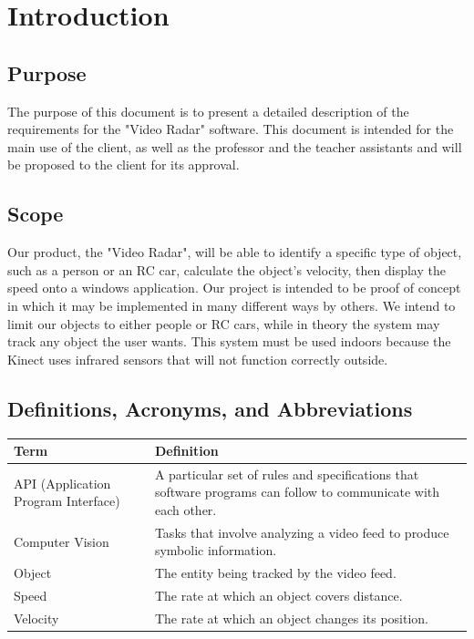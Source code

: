 \documentclass[onecolumn, draftclsnofoot,10pt, compsoc]{IEEEtran}
\begin{document}
\newpage
{}
\tableofcontents
\clearpage


\section{Introduction}
\subsection{Purpose}
The purpose of this document is to present a detailed description of the requirements for the "Video Radar" software.
This document is intended for the main use of the client, as well as the professor and the teacher assistants and will be proposed to the client for its approval.

\subsection{Scope}
Our product, the "Video Radar", will be able to identify a specific type of object, such as a person or an RC car, calculate the object's velocity, then display the speed onto a windows application.
Our project is intended to be proof of concept in which it may be implemented in many different ways by others.
We intend to limit our objects to either people or RC cars, while in theory the system may track any object the user wants.
This system must be used indoors because the Kinect uses infrared sensors that will not function correctly outside.
\subsection{Definitions, Acronyms, and Abbreviations}
\begin{tabular}{|p{4cm}|p{12cm}|}
	\hline
	\textbf{Term} & \textbf{Definition} \\
	\hline
	API (Application Program Interface) & A particular set of rules and specifications that software programs can follow to communicate with each other. \\
	\hline
    Computer Vision & Tasks that involve analyzing a video feed to produce symbolic information.  \\
	\hline
	Object & The entity being tracked by the video feed.  \\
	\hline
    Speed & The rate at which an object covers distance.  \\
	\hline
    Velocity & The rate at which an object changes its position.  \\
	\hline
	
\end{tabular}
\end{document}
